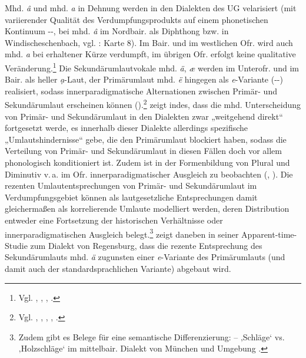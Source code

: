 Mhd. \textit{â} und mhd. \textit{a} in Dehnung werden in den Dialekten des UG velarisiert (mit variierender Qualität des Verdumpfungsprodukts auf einem phonetischen Kontinuum --, bei mhd. \textit{â} im Nordbair. als Diphthong  bzw.  in Windischeschenbach, vgl. \citealt{Gütter1971}: Karte 8). Im Bair. und im westlichen Ofr. wird auch mhd. \textit{a} bei erhaltener Kürze verdumpft, im übrigen Ofr. erfolgt keine qualitative Veränderung.{\footnote{Vgl. \citet[§1b und Karte 1]{Kranzmayer1956}, \citet[57--58 und Karte 9]{Rowley1997}, \citet[200--201]{Schirmunski1962}, \citet[46--50 und Karte 2]{Steger1968}.}} Die Sekundär\-umlautvokale mhd. \textit{ä}, {\textit{æ}} werden im Unterofr. und im Bair. als heller \textit{ạ}{}-Laut, der Primär\-umlaut mhd. \textit{ë} hingegen als \textit{e}{}-Variante (--) realisiert, sodass innerparadigmatische Alternationen zwischen Primär- und Sekundär\-umlaut erscheinen können ().\footnote{Vgl. \citet[Karte 2]{Gütter1971}, \citet[§2, §3d und Karte 2]{Kranzmayer1956}, \citet[59--63 und Karte 10]{Rowley1997}, \citet[197]{Schirmunski1962}, \citet[52--63]{Steger1968}.} \citet[§9]{Werner1961} zeigt indes, dass die mhd. Unterscheidung von Primär- und Sekundär\-umlaut in den Dialekten zwar „weitgehend direkt“ fortgesetzt werde, es innerhalb dieser Dialekte allerdings spezifische „Umlautshindernisse“ gebe, die den Primär\-umlaut blockiert haben, sodass die Verteilung von Primär- und Sekundär\-umlaut in diesen Fällen doch vor allem phonologisch konditioniert ist. Zudem ist in der Formenbildung von Plural und Diminutiv v.\,a. im Ofr. innerparadigmatischer Ausgleich zu beobachten (\citealt[60]{Rowley1997}, \citealt[52]{Steger1968}). Die rezenten Umlautentsprechungen von Primär- und Sekundär\-umlaut im Verdumpfungsgebiet können als lautgesetzliche Entsprechungen damit gleichermaßen als korrelierende Umlaute modelliert werden, deren Distribution entweder eine Fortsetzung der historischen Verhältnisse oder innerparadigmatischen Ausgleich belegt.\footnote{Zudem gibt es Belege für eine semantische Differenzierung:  --  ‚Schläge‘ vs.  ‚Holzschläge‘ im mittelbair. Dialekt von München und Umgebung \citep[78]{Wittmann1943}.}  \citet[130--133]{Keller1976} zeigt daneben in seiner Apparent-time-Studie zum Dialekt von Regensburg, dass die rezente Entsprechung des Sekundär\-umlauts mhd. \textit{ä} zugunsten einer \textit{e}{}-Variante des Primär\-umlauts (und damit auch der standardsprachlichen Variante) abgebaut wird.


